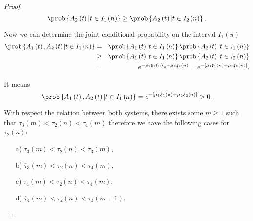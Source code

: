\begin{proof}
\begin{equation}
\prob\left\{A_{2}\left(t\right)|t\in I_{1}\left(n\right)\right\}\geq
\prob\left\{A_{2}\left(t\right)|t\in I_{2}\left(n\right)\right\}.
\end{equation}

Now we can determine the joint conditional probability on the interval $I_{1}\left(n\right)$
\begin{eqnarray*}
\prob\left\{A_{1}\left(t\right),A_{2}\left(t\right)|t\in I_{1}\left(n\right)\right\}&=&
\prob\left\{A_{1}\left(t\right)|t\in I_{1}\left(n\right)\right\}
\prob\left\{A_{2}\left(t\right)|t\in I_{1}\left(n\right)\right\}\\
&\geq&
\prob\left\{A_{1}\left(t\right)|t\in I_{1}\left(n\right)\right\}
\prob\left\{A_{2}\left(t\right)|t\in I_{2}\left(n\right)\right\}\\
&=&e^{-\tilde{\mu}_{1}\xi_{1}\left(n\right)}e^{-\tilde{\mu}_{2}\xi_{2}\left(n\right)}
=e^{-\left[\tilde{\mu}_{1}\xi_{1}\left(n\right)+\tilde{\mu}_{2}\xi_{2}\left(n\right)\right]}.
\end{eqnarray*}

It means 
\begin{equation}
\prob\left\{A_{1}\left(t\right),A_{2}\left(t\right)|t\in I_{1}\left(n\right)\right\}
=e^{-\left[\tilde{\mu}_{1}\xi_{1}\left(n\right)+\tilde{\mu}_{2}\xi_{2}
\left(n\right)\right]}>0.
\end{equation}

With respect the relation between both systems, there exists some $m\geq1$ such that $\tau_{3}\left(m\right)<\tau_{2}\left(n\right)<\tau_{4}\left(m\right)$ therefore we have the following cases for $\tau_{2}\left(n\right)$:

\begin{multicols}{2}
\begin{itemize}
\item[a)] $\tau_{3}\left(m\right)<\tau_{2}\left(n\right)<\overline{\tau}_{3}\left(m\right)$,

\item[b)] $\overline{\tau}_{3}\left(m\right)<\tau_{2}\left(n\right)
<\tau_{4}\left(m\right)$,

\item[c)] $\tau_{4}\left(m\right)<\tau_{2}\left(n\right)<
\overline{\tau}_{4}\left(m\right)$,

\item[d)] $\overline{\tau}_{4}\left(m\right)<\tau_{2}\left(n\right)
<\tau_{3}\left(m+1\right)$.
\end{itemize}
\end{multicols}


\end{proof}
